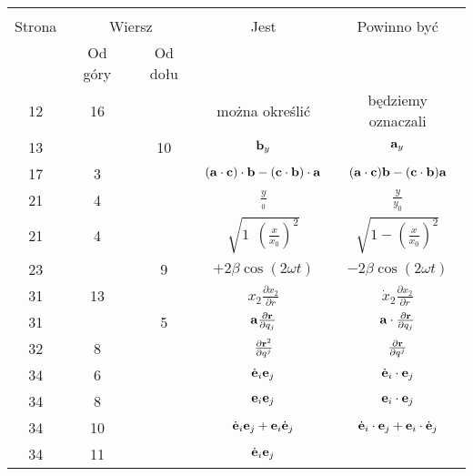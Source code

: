 \documentclass[a4paper,11pt]{article}
\begin{document}
\begin{center}

  \begin{tabular}{|c|c|c|c|c|}
    \hline
    & \multicolumn{2}{c|}{} & & \\
    Strona & \multicolumn{2}{c|}{Wiersz} & Jest
                              & Powinno być \\ \cline{2-3}
    & Od góry & Od dołu & & \\
    \hline
    12  & 16 & & można określić & będziemy oznaczali \\
    13  & & 10 & $\mathbf{b}_{ y }$ & $\mathbf{a}_{ y }$ \\
    17  &  3 & & $( \mathbf{a} \cdot \mathbf{c} ) \cdot \mathbf{b}
                 - ( \mathbf{c} \cdot \mathbf{b} ) \cdot \mathbf{a}$
           & $( \mathbf{a} \cdot \mathbf{c} ) \mathbf{b}
             - ( \mathbf{c} \cdot \mathbf{b} ) \mathbf{a}$ \\
    21  &  4 & & $\frac{ y }{ { }_{ 0 } }$ & $\frac{ y }{ { y }_{ 0 } }$ \\
    21  &  4 & & $\sqrt{ 1 \:\: \left( \frac{ x }{ x_{ 0 } } \right)^{ 2 } }$
           & $\sqrt{ 1 - \left( \frac{ x }{ x_{ 0 } } \right)^{ 2 } } $ \\
    23  & &  9 & $+2\beta \cos( 2\omega t )$ & $-2\beta \cos( 2\omega t )$ \\
    31  & 13 & & $x_{ 2 } \frac{ \partial x_{ 2 } }{ \partial r }$
           & $\dot{ x }_{ 2 } \frac{ \partial x_{ 2 } }{ \partial r }$ \\
    31  & &  5 & $\mathbf{a} \frac{ \partial \mathbf{r} }{ \partial q_{ j } }$
           & $\mathbf{a} \cdot \frac{ \partial \mathbf{r} }{ \partial q_{ j } }$ \\
    32  &  8 & & $\frac{ \partial \mathbf{r}^{ 2 } }{ \partial { q^{ j } } }$
           & $\frac{ \partial \mathbf{r} }{ \partial { q^{ j } } }$ \\
    34  &  6 & & $\dot{ \mathbf{e} }_{ i } \mathbf{e}_{ j }$
           & $\dot{ \mathbf{e} }_{ i } \cdot \mathbf{e}_{ j }$ \\
    34  &  8 & & $\mathbf{e}_{ i } \mathbf{e}_{ j }$
           & $\mathbf{e}_{ i } \cdot \mathbf{e}_{ j }$ \\
    34  & 10 & & $\dot{ \mathbf{e} }_{ i } \mathbf{e}_{ j }
                 + \mathbf{e}_{ i } \dot{ \mathbf{e} }_{ j }$
           & $\dot{ \mathbf{e} }_{ i } \cdot \mathbf{e}_{ j }
             + \mathbf{e}_{ i } \cdot \dot{ \mathbf{e} }_{ j }$ \\
    34  & 11 & & $\dot{ \mathbf{e} }_{ i } \mathbf{e}_{ j }$

\end{tabular}
\end{center}
\end{document}
